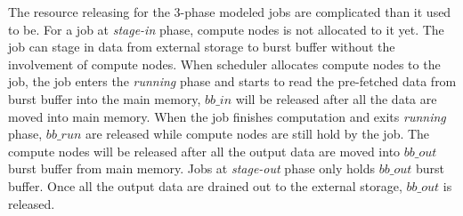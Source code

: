 

The resource releasing for the 3-phase modeled jobs are complicated than it used to be. 
For a job at \textit{stage-in} phase, compute nodes is not allocated to it yet. 
The job can stage in data from external storage to burst buffer without the involvement of compute nodes.
When scheduler allocates compute nodes to the job, the job enters the \textit{running} phase 
and starts to read the pre-fetched data from burst buffer into the main memory, 
$bb\_in$ will be released after all the data are moved into main memory. 
When the job finishes computation and exits \textit{running} phase, 
$bb\_run$ are released while compute nodes are still hold by the job. 
The compute nodes will be released after all the output data are moved into $bb\_out$ burst buffer from main memory.
Jobs at \textit{stage-out} phase only holds $bb\_out$ burst buffer. 
Once all the output data are drained out to the external storage,  
$bb\_out$ is released.
